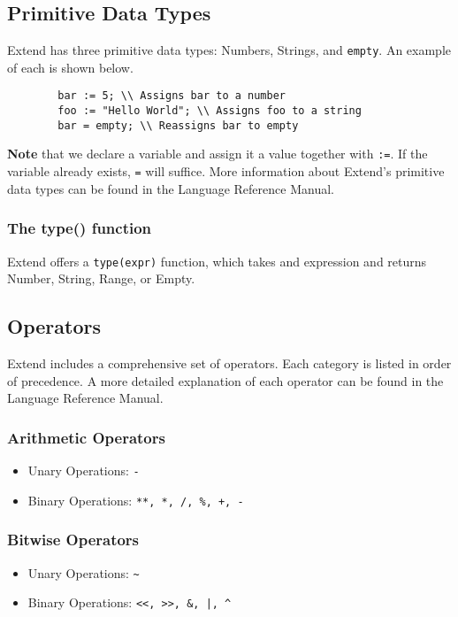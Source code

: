 	\subsection{Primitive Data Types}
	Extend has three primitive data types: Numbers, Strings, and \texttt{empty}. An example of each is shown below.

	\begin{lstlisting}
		bar := 5; \\ Assigns bar to a number
		foo := "Hello World"; \\ Assigns foo to a string
		bar = empty; \\ Reassigns bar to empty
	\end{lstlisting}

	\medskip \noindent
	\textbf{Note} that we declare a variable and assign it a value together with \texttt{:=}. If the variable already exists, \texttt{=} will suffice.
	More information about Extend's primitive data types can be found in the Language Reference Manual.

		\subsubsection{The type() function}
		Extend offers a \texttt{type(expr)} function, which takes and expression and returns Number, String, Range, or Empty.

	\subsection{Operators}
	Extend includes a comprehensive set of operators. Each category is listed in order of precedence. A more detailed explanation of each operator can be found in the Language Reference Manual.

		\subsubsection{Arithmetic Operators}
			\begin{itemize}
				\item Unary Operations: \texttt{-}
				\item Binary Operations: \texttt{**, *, /, \%, +, -}
			\end{itemize}

		\subsubsection{Bitwise Operators}
			\begin{itemize}
				\item Unary Operations: \texttt{\~}
				\item Binary Operations: \texttt{<<, >>, \&, |, \^}
			\end{itemize}

